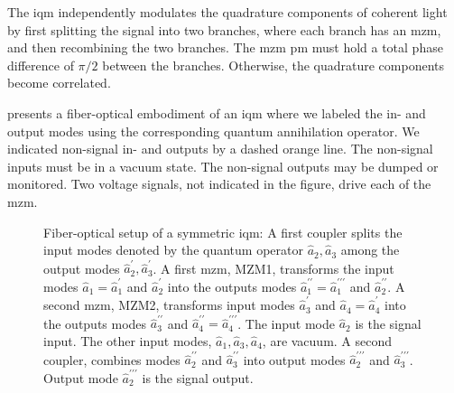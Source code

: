 The \gls{iqm} independently modulates the quadrature components of coherent light by first splitting the signal into two branches, where each branch has an \gls{mzm}, and then recombining the two branches.
The \gls{mzm} \gls{pm} must hold a total phase difference of $\pi/2$ between the branches.
Otherwise, the quadrature components become correlated.

 presents a fiber-optical embodiment of an \gls{iqm} where we labeled the in- and output modes using the corresponding quantum annihilation operator.
We indicated non-signal in- and outputs by a dashed orange line.
The non-signal inputs must be in a vacuum state.
The non-signal outputs may be dumped or monitored.
Two voltage signals, not indicated in the figure, drive each of the \gls{mzm}.
\begin{figure}[htb]
	\centering
	
	\caption{Fiber-optical setup of a symmetric \gls{iqm}: A first coupler splits the input modes denoted by the quantum operator $\hat{a}_2,\hat{a}_3$ among the output modes $\hat{a}_2^\prime,\hat{a}_3^\prime$. A first \gls{mzm}, MZM1, transforms the input modes $\hat{a}_1=\hat{a}_1^\prime$ and $\hat{a}_2^\prime$ into the outputs modes $\hat{a}_1^{\prime\prime}=\hat{a}_1^{\prime\prime\prime}$ and $\hat{a}_2^{\prime\prime}$. A second \gls{mzm}, MZM2, transforms input modes $\hat{a}_3^\prime$ and $\hat{a}_4=\hat{a}_4^{\prime}$ into the outputs modes $\hat{a}_3^{\prime\prime}$ and $\hat{a}_4^{\prime\prime}=\hat{a}_4^{\prime\prime\prime}$. 	The input mode $\hat{a}_2$ is the signal input. The other input modes, $\hat{a}_1,\hat{a}_3,\hat{a}_4$, are vacuum. A second coupler, combines modes $\hat{a}_2^{\prime\prime}$ and $\hat{a}_3^{\prime\prime}$ into output modes $\hat{a}_2^{\prime\prime\prime}$ and $\hat{a}_3^{\prime\prime\prime}$. Output mode $\hat{a}_2^{\prime\prime\prime}$ is the signal output.}\label{fig:iqm}
\end{figure}

